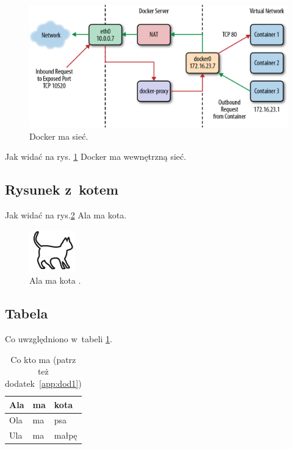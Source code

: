 \begin{figure}
    \centering\includegraphics[width=.6\textwidth]{demo/img/swarm-network}
    \caption{Docker ma sieć\cite{docker_compose_reference}.}  \label{rys:network}
\end{figure}

Jak widać na rys. \ref{rys:network} Docker ma wewnętrzną sieć. \lipsum[1]


\subsection{Rysunek z~kotem}

Jak widać na rys.\ref{rysunek:kot} Ala ma kota. \lipsum[9-10]

\begin{figure}[H]
    \centering\includegraphics[width=.4\textwidth]{demo/img/kotek}
    \caption{Ala ma kota \source{\ownwork}.}\label{rysunek:kot}
\end{figure}

\subsection{Tabela}

Co uwzględniono w~tabeli \ref{tabela:coktoma}. \lipsum[13-15]

\begin{table}[h!]
    \centering\caption{Co kto ma\cite{harel_rzecz_2008} (patrz też dodatek~\ref{app:dod1}) \label{tabela:coktoma}}
    \begin{tabular}{|l|l|l|}%
        \hline
        Ala & ma & kota \\
        \hline
        Ola & ma & psa \\
        \hline
        Ula & ma & małpę\\
        \hline
    \end{tabular}
\end{table}

